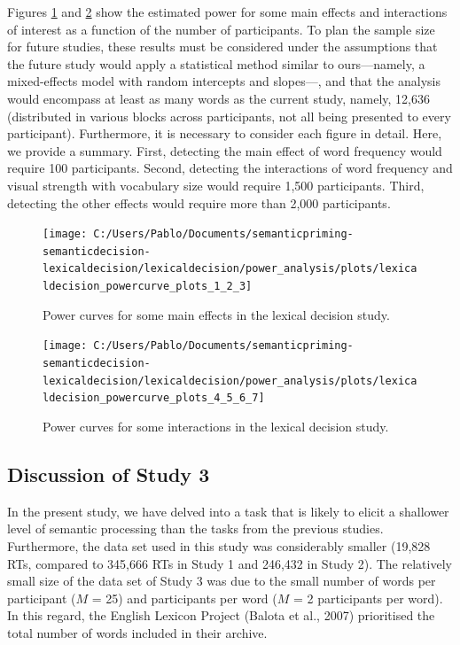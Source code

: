 \documentclass[
  12pt,
  man,floatsintext]{apa7}
\begin{document}
Figures \ref{fig:lexicaldecision-powercurve-plots-1-2-3} and \ref{fig:lexicaldecision-powercurve-plots-4-5-6-7} show the estimated power for some main effects and interactions of interest as a function of the number of participants. To plan the sample size for future studies, these results must be considered under the assumptions that the future study would apply a statistical method similar to ours---namely, a mixed-effects model with random intercepts and slopes---, and that the analysis would encompass at least as many words as the current study, namely, 12,636 (distributed in various blocks across participants, not all being presented to every participant). Furthermore, it is necessary to consider each figure in detail. Here, we provide a summary. First, detecting the main effect of word frequency would require 100 participants. Second, detecting the interactions of word frequency and visual strength with vocabulary size would require 1,500 participants. Third, detecting the other effects would require more than 2,000 participants.

\begin{figure}

{\centering \texttt{[image: C:/Users/Pablo/Documents/semanticpriming-semanticdecision-lexicaldecision/lexicaldecision/power\_analysis/plots/lexicaldecision\_powercurve\_plots\_1\_2\_3]} 

}

\caption{Power curves for some main effects in the lexical decision study.}\label{fig:lexicaldecision-powercurve-plots-1-2-3}
\end{figure}

\begin{figure}

{\centering \texttt{[image: C:/Users/Pablo/Documents/semanticpriming-semanticdecision-lexicaldecision/lexicaldecision/power\_analysis/plots/lexicaldecision\_powercurve\_plots\_4\_5\_6\_7]} 

}

\caption{Power curves for some interactions in the lexical decision study.}\label{fig:lexicaldecision-powercurve-plots-4-5-6-7}
\end{figure}

\hypertarget{discussion-of-study-3}{%
\subsection{Discussion of Study 3}\label{discussion-of-study-3}}

In the present study, we have delved into a task that is likely to elicit a shallower level of semantic processing than the tasks from the previous studies. Furthermore, the data set used in this study was considerably smaller (19,828 RTs, compared to 345,666 RTs in Study 1 and 246,432 in Study 2). The relatively small size of the data set of Study 3 was due to the small number of words per participant (\(M\) = 25) and participants per word (\(M\) = 2 participants per word). In this regard, the English Lexicon Project (Balota et al., 2007) prioritised the total number of words included in their archive.
\end{document}
